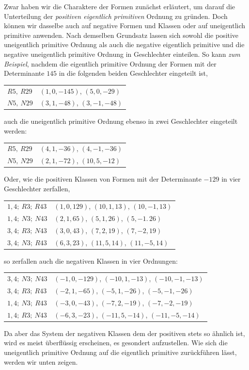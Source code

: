 Zwar haben wir die Charaktere der Formen zunächst erläutert, um darauf die Unterteilung der \textit{positiven eigentlich primitiven} Ordnung zu gründen. Doch können wir dasselbe auch auf negative Formen und Klassen oder auf uneigentlich primitive anwenden. Nach demselben Grundsatz lassen sich sowohl die positive uneigentlich primitive Ordnung als auch die negative eigentlich primitive und die negative uneigentlich primitive Ordnung in Geschlechter einteilen. So kann \textit{zum Beispiel}, nachdem die eigentlich primitive Ordnung der Formen mit der Determinante $145$ in die folgenden beiden Geschlechter eingeteilt ist,
\begin{center}
\begin{tabular}{l|l}
$R5,\ R29$ & $(1,0,-145)$, $(5,0,-29)$ \\
$N5,\ N29$ & $(3,1,-48)$, $(3,-1,-48)$
\end{tabular}
\end{center}
auch die uneigentlich primitive Ordnung ebenso in zwei Geschlechter eingeteilt werden:
\begin{center}
\begin{tabular}{l|l}
$R5,\ R29$ & $(4,1,-36)$, $(4,-1,-36)$ \\
$N5,\ N29$ & $(2,1,-72)$, $(10,5,-12)$
\end{tabular}
\end{center}
Oder, wie die positiven Klassen von Formen mit der Determinante $-129$ in vier Geschlechter zerfallen,
\begin{center}
\begin{tabular}{l|l}
$1,4;\ R3;\ R43$ & $(1,0,129)$, $(10,1,13)$, $(10,-1,13)$ \\
$1,4;\ N3;\ N43$ & $(2,1,65)$, $(5,1,26)$, $(5,-1.\,26)$ \\
$3,4;\ R3;\ N43$ & $(3,0,43)$, $(7,2,19)$, $(7,-2,19)$ \\
$3,4;\ N3;\ R43$ & $(6,3,23)$, $(11,5,14)$, $(11,-5,14)$
\end{tabular}
\end{center}
so zerfallen auch die negativen Klassen in vier Ordnungen:
\begin{center}
\begin{tabular}{l|l}
$3,4;\ N3;\ N43$ & $(-1,0,-129)$, $(-10,1,-13)$, $(-10,-1,-13)$ \\
$3,4;\ R3;\ R43$ & $(-2,1,-65)$, $(-5,1,-26)$, $(-5,-1,-26)$ \\
$1,4;\ N3;\ R43$ & $(-3,0,-43)$, $(-7,2,-19)$, $(-7,-2,-19)$ \\
$1,4;\ R3;\ N43$ & $(-6,3,-23)$, $(-11,5,-14)$, $(-11,-5,-14)$
\end{tabular}
\end{center}
Da aber das System der negativen Klassen dem der positiven stets so ähnlich ist, wird es meist überflüssig erscheinen, es gesondert aufzustellen. Wie sich die uneigentlich primitive Ordnung auf die eigentlich primitive zurückführen lässt, werden wir unten zeigen.

